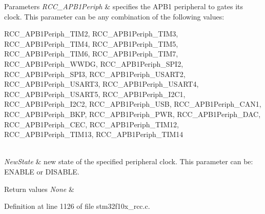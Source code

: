 \begin{DoxyParams}{Parameters}
{\em R\+C\+C\+\_\+\+A\+P\+B1\+Periph} & specifies the A\+P\+B1 peripheral to gates its clock. This parameter can be any combination of the following values\+: \begin{DoxyItemize}
\item R\+C\+C\+\_\+\+A\+P\+B1\+Periph\+\_\+\+T\+I\+M2, R\+C\+C\+\_\+\+A\+P\+B1\+Periph\+\_\+\+T\+I\+M3, R\+C\+C\+\_\+\+A\+P\+B1\+Periph\+\_\+\+T\+I\+M4, R\+C\+C\+\_\+\+A\+P\+B1\+Periph\+\_\+\+T\+I\+M5, R\+C\+C\+\_\+\+A\+P\+B1\+Periph\+\_\+\+T\+I\+M6, R\+C\+C\+\_\+\+A\+P\+B1\+Periph\+\_\+\+T\+I\+M7, R\+C\+C\+\_\+\+A\+P\+B1\+Periph\+\_\+\+W\+W\+DG, R\+C\+C\+\_\+\+A\+P\+B1\+Periph\+\_\+\+S\+P\+I2, R\+C\+C\+\_\+\+A\+P\+B1\+Periph\+\_\+\+S\+P\+I3, R\+C\+C\+\_\+\+A\+P\+B1\+Periph\+\_\+\+U\+S\+A\+R\+T2, R\+C\+C\+\_\+\+A\+P\+B1\+Periph\+\_\+\+U\+S\+A\+R\+T3, R\+C\+C\+\_\+\+A\+P\+B1\+Periph\+\_\+\+U\+S\+A\+R\+T4, R\+C\+C\+\_\+\+A\+P\+B1\+Periph\+\_\+\+U\+S\+A\+R\+T5, R\+C\+C\+\_\+\+A\+P\+B1\+Periph\+\_\+\+I2\+C1, R\+C\+C\+\_\+\+A\+P\+B1\+Periph\+\_\+\+I2\+C2, R\+C\+C\+\_\+\+A\+P\+B1\+Periph\+\_\+\+U\+SB, R\+C\+C\+\_\+\+A\+P\+B1\+Periph\+\_\+\+C\+A\+N1, R\+C\+C\+\_\+\+A\+P\+B1\+Periph\+\_\+\+B\+KP, R\+C\+C\+\_\+\+A\+P\+B1\+Periph\+\_\+\+P\+WR, R\+C\+C\+\_\+\+A\+P\+B1\+Periph\+\_\+\+D\+AC, R\+C\+C\+\_\+\+A\+P\+B1\+Periph\+\_\+\+C\+EC, R\+C\+C\+\_\+\+A\+P\+B1\+Periph\+\_\+\+T\+I\+M12, R\+C\+C\+\_\+\+A\+P\+B1\+Periph\+\_\+\+T\+I\+M13, R\+C\+C\+\_\+\+A\+P\+B1\+Periph\+\_\+\+T\+I\+M14 \end{DoxyItemize}
\\
\hline
{\em New\+State} & new state of the specified peripheral clock. This parameter can be\+: E\+N\+A\+B\+LE or D\+I\+S\+A\+B\+LE. \\
\hline
\end{DoxyParams}

\begin{DoxyRetVals}{Return values}
{\em None} & \\
\hline
\end{DoxyRetVals}


Definition at line 1126 of file stm32f10x\+\_\+rcc.\+c.

